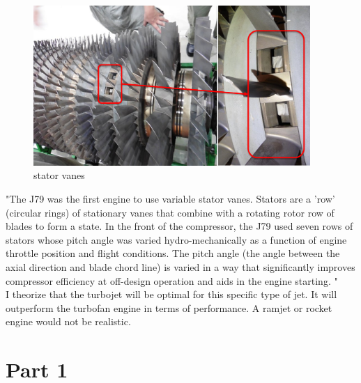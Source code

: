 \documentclass[12pt]{report}
\begin{document}
\begin{figure}[htp]
    \centering
    \includegraphics[width=10.5cm]{variable stator vanes.png}
    \caption{stator vanes}
    \label{fig:stator vanes}
\end{figure}

"The J79 was the first engine to use variable stator vanes. Stators are a 'row' (circular rings) of stationary vanes that combine with a rotating rotor row of blades to form a state. In the front of the compressor, the J79 used seven rows of stators whose pitch angle was varied hydro-mechanically as a function of engine throttle position and flight conditions. The pitch angle (the angle between the axial direction and blade chord line) is varied in a way that significantly improves compressor efficiency at off-design operation and aids in the engine starting. \cite{mattingly2006elements}"\\

I theorize that the turbojet will be optimal for this specific type of jet.  It will outperform the turbofan engine in terms of performance.  A ramjet or rocket engine would not be realistic.\\

\newpage
\chapter{Part 1}

\end{document}
